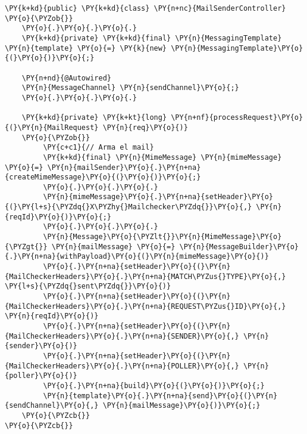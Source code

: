 \begin{Verbatim}[commandchars=\\\{\}]
\PY{k+kd}{public} \PY{k+kd}{class} \PY{n+nc}{MailSenderController}
\PY{o}{\PYZob{}}
    \PY{o}{.}\PY{o}{.}\PY{o}{.}
    \PY{k+kd}{private} \PY{k+kd}{final} \PY{n}{MessagingTemplate} \PY{n}{template} \PY{o}{=} \PY{k}{new} \PY{n}{MessagingTemplate}\PY{o}{(}\PY{o}{)}\PY{o}{;}

    \PY{n+nd}{@Autowired}
    \PY{n}{MessageChannel} \PY{n}{sendChannel}\PY{o}{;}
    \PY{o}{.}\PY{o}{.}\PY{o}{.}

    \PY{k+kd}{private} \PY{k+kt}{long} \PY{n+nf}{processRequest}\PY{o}{(}\PY{n}{MailRequest} \PY{n}{req}\PY{o}{)}
    \PY{o}{\PYZob{}}
         \PY{c+c1}{// Arma el mail}
         \PY{k+kd}{final} \PY{n}{MimeMessage} \PY{n}{mimeMessage} \PY{o}{=} \PY{n}{mailSender}\PY{o}{.}\PY{n+na}{createMimeMessage}\PY{o}{(}\PY{o}{)}\PY{o}{;}
         \PY{o}{.}\PY{o}{.}\PY{o}{.}
         \PY{n}{mimeMessage}\PY{o}{.}\PY{n+na}{setHeader}\PY{o}{(}\PY{l+s}{\PYZdq{}X\PYZhy{}Mailchecker\PYZdq{}}\PY{o}{,} \PY{n}{reqId}\PY{o}{)}\PY{o}{;}
         \PY{o}{.}\PY{o}{.}\PY{o}{.}
         \PY{n}{Message}\PY{o}{\PYZlt{}}\PY{n}{MimeMessage}\PY{o}{\PYZgt{}} \PY{n}{mailMessage} \PY{o}{=} \PY{n}{MessageBuilder}\PY{o}{.}\PY{n+na}{withPayload}\PY{o}{(}\PY{n}{mimeMessage}\PY{o}{)}
         \PY{o}{.}\PY{n+na}{setHeader}\PY{o}{(}\PY{n}{MailCheckerHeaders}\PY{o}{.}\PY{n+na}{MATCH\PYZus{}TYPE}\PY{o}{,} \PY{l+s}{\PYZdq{}sent\PYZdq{}}\PY{o}{)}
         \PY{o}{.}\PY{n+na}{setHeader}\PY{o}{(}\PY{n}{MailCheckerHeaders}\PY{o}{.}\PY{n+na}{REQUEST\PYZus{}ID}\PY{o}{,} \PY{n}{reqId}\PY{o}{)}
         \PY{o}{.}\PY{n+na}{setHeader}\PY{o}{(}\PY{n}{MailCheckerHeaders}\PY{o}{.}\PY{n+na}{SENDER}\PY{o}{,} \PY{n}{sender}\PY{o}{)}
         \PY{o}{.}\PY{n+na}{setHeader}\PY{o}{(}\PY{n}{MailCheckerHeaders}\PY{o}{.}\PY{n+na}{POLLER}\PY{o}{,} \PY{n}{poller}\PY{o}{)}
         \PY{o}{.}\PY{n+na}{build}\PY{o}{(}\PY{o}{)}\PY{o}{;}
         \PY{n}{template}\PY{o}{.}\PY{n+na}{send}\PY{o}{(}\PY{n}{sendChannel}\PY{o}{,} \PY{n}{mailMessage}\PY{o}{)}\PY{o}{;}
    \PY{o}{\PYZcb{}}
\PY{o}{\PYZcb{}}
\end{Verbatim}
